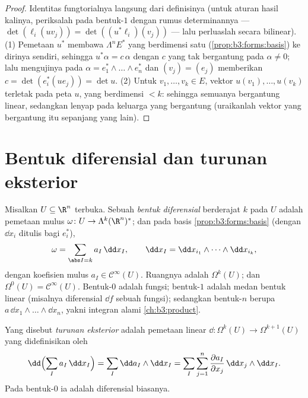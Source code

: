 \begin{proof}
Identitas fungtorialnya langsung dari definisinya
(untuk aturan hasil kalinya, periksalah pada  bentuk-$1$ dengan
rumus determinannya --- $\det(\ell_i(uv_j)) =
\det((u^*\ell_i)(v_j))$ --- lalu perluaslah secara bilinear).
(1) Pemetaan $u^*$ membawa $\Lambda^nE^*$ yang berdimensi satu
(\cref{prop:b3:forms:basis}) ke dirinya sendiri, sehingga $u^*\alpha =
c\,\alpha$ dengan $c$ yang tak bergantung pada $\alpha \neq 0$; lalu mengujinya
pada $\alpha = e_1^* \wedge \dots \wedge e_n^*$ dan $(v_j) =
(e_j)$ memberikan $c = \det(e_i^*(ue_j)) = \det u$.
(2) Untuk $v_1, \dots, v_k \in E$, vektor $u(v_1), \dots,
u(v_k)$ terletak pada peta $u$, yang berdimensi $< k$: sehingga semuanya
bergantung linear, sedangkan  lenyap pada keluarga
yang bergantung (uraikanlah vektor yang bergantung itu sepanjang yang
lain).
\end{proof}

\section{Bentuk diferensial dan turunan eksterior}

\begin{definition}\label{def:b3:forms:diffform}
Misalkan $U \subseteq \R^n$ terbuka. Sebuah \emph{bentuk
diferensial} berderajat $k$ pada $U$ adalah pemetaan mulus
$\omega\colon U \to \Lambda^k(\R^n)^*$; dan pada basis
\cref{prop:b3:forms:basis} (dengan $\dd x_i$ ditulis bagi
$e_i^*$),
\[
\omega = \sum_{\abs I = k} a_I\,\dd x_I,
\qquad
\dd x_I = \dd x_{i_1} \wedge \dots \wedge \dd x_{i_k},
\]
dengan koefisien mulus $a_I \in \mathcal C^\infty(U)$.
Ruangnya adalah $\Omega^k(U)$; dan $\Omega^0(U) = \mathcal
C^\infty(U)$. Bentuk-$0$ adalah fungsi; bentuk-$1$ adalah medan
bentuk linear (misalnya diferensial $\dd f$ sebuah
fungsi); sedangkan bentuk-$n$ berupa $a\,\dd x_1\wedge\dots\wedge\dd
x_n$, yakni integran alami \cref{ch:b3:product}.
\end{definition}

\begin{definition}\label{def:b3:forms:d}
Yang disebut \emph{turunan eksterior} adalah
pemetaan linear $\dd\colon \Omega^k(U) \to \Omega^{k+1}(U)$
yang didefinisikan oleh
\[
\dd\Bigl(\sum_I a_I\,\dd x_I\Bigr)
= \sum_I \dd a_I \wedge \dd x_I
= \sum_I\sum_{j=1}^n \frac{\partial a_I}{\partial
x_j}\,\dd x_j \wedge \dd x_I .
\]
Pada bentuk-$0$ ia adalah diferensial biasanya.
\end{definition}

